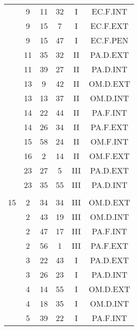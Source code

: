 \documentclass[12pt, a4paper]{article}
\begin{document}
\begin{multicols}{3}
{\begin{tabular}{c c c c c c}
	 	 	 	 & 9 & 11 & 32 & I & EC.F.INT\\%
	 	 	 	 & 9 & 15 & 7 & I & EC.F.EXT\\%
	 	 	 	 & 9 & 15 & 47 & I & EC.F.PEN\\%
	 	 	 	 & 11 & 35 & 32 & II & PA.D.EXT\\%
	 	 	 	 & 11 & 39 & 27 & II & PA.D.INT\\%
	 	 	 	 & 13 & 9 & 42 & II & OM.D.EXT\\%
	 	 	 	 & 13 & 13 & 37 & II & OM.D.INT\\%
	 	 	 	 & 14 & 22 & 44 & II & PA.F.INT\\%
	 	 	 	 & 14 & 26 & 34 & II & PA.F.EXT\\%
	 	 	 	 & 15 & 58 & 24 & II & OM.F.INT\\%
	 	 	 	 & 16 & 2 & 14 & II & OM.F.EXT\\%
	 	 	 	 & 23 & 27 & 5 & III & PA.D.EXT\\%
	 	 	 	 & 23 & 35 & 55 & III & PA.D.INT\\%
	 	 	 	 & & & & & \\%
	 	 	 	15 & 2 & 34 & 34 & III & OM.D.EXT\\%
	 	 	 	 & 2 & 43 & 19 & III & OM.D.INT\\%
	 	 	 	 & 2 & 47 & 17 & III & PA.F.INT\\%
	 	 	 	 & 2 & 56 & 1 & III & PA.F.EXT\\%
	 	 	 	 & 3 & 22 & 43 & I & PA.D.EXT\\%
	 	 	 	 & 3 & 26 & 23 & I & PA.D.INT\\%
	 	 	 	 & 4 & 14 & 55 & I & OM.D.EXT\\%
	 	 	 	 & 4 & 18 & 35 & I & OM.D.INT\\%
	 	 	 	 & 5 & 39 & 22 & I & PA.F.INT\\%

\end{tabular}}
\end{multicols}
\end{document}
